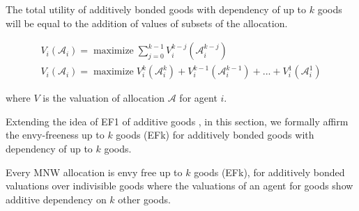 The total utility of additively bonded goods with dependency of up to $k$ goods will be equal to the addition of values of subsets of the allocation.

\begin{equation}
\label{eq_abgv}
\begin{gathered}
    V_i(\mathcal{A}_i) = \operatorname{maximize} \sum_{j=0}^{k-1} V^{k-j}_i(\mathcal{A}^{k-j}_i) \\
    V_i(\mathcal{A}_i) = \operatorname{maximize} V^k_i(\mathcal{A}^k_i) + V^{k-1}_i(\mathcal{A}^{k-1}_i) + ... + V^1_i(\mathcal{A}^{1}_i)
\end{gathered}
\end{equation}

where $V$ is the valuation of allocation $\mathcal{A}$ for agent $i$. 

Extending the idea of EF1 of additive goods \cite{caragiannis2016unreasonable}, in this section, we formally affirm the envy-freeness up to $k$ goods (EFk) for additively bonded goods with dependency of up to $k$ goods.

\begin{theorem}
Every MNW allocation is envy free up to $k$ goods (EFk), for additively bonded valuations over indivisible goods where the valuations of an agent for goods show additive dependency on $k$ other goods.
\end{theorem}


